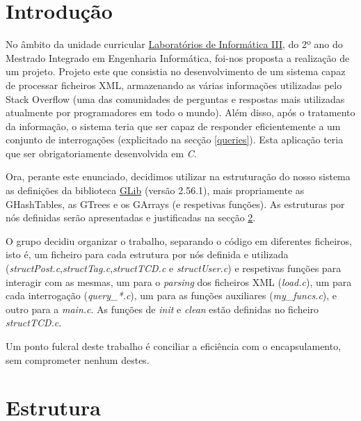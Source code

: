 \documentclass[a4paper, 11pt, oneside]{article}
\begin{document}

\tableofcontents
\lstlistoflistings

\newpage


\section{Introdução}

No âmbito da unidade curricular \underline{Laboratórios de Informática III}, do 2º ano do Mestrado Integrado em Engenharia Informática, foi-nos proposta a realização de um projeto. Projeto este que consistia no desenvolvimento de um sistema capaz de processar ficheiros XML, armazenando as várias informações utilizadas pelo Stack Overflow (uma das comunidades de perguntas e respostas mais utilizadas atualmente por programadores em todo o mundo). Além disso, após o tratamento da informação, o sistema teria que ser capaz de responder eficientemente a um conjunto de interrogações (explicitado na secção \ref{queries}). Esta aplicação teria que ser obrigatoriamente desenvolvida em \textit{C}.

Ora, perante este enunciado, decidimos utilizar na estruturação do nosso sistema as definições da biblioteca \href{https://developer.gnome.org/glib}{GLib} (versão 2.56.1), mais propriamente as GHashTables, as GTrees e os GArrays (e respetivas funções). As estruturas por nós definidas serão apresentadas e justificadas na secção \ref{structs}.

O grupo decidiu organizar o trabalho, separando o código em diferentes ficheiros, isto é, um ficheiro para cada estrutura por nós definida e utilizada (\textit{structPost.c},\textit{structTag.c},\textit{structTCD.c} e \textit{structUser.c}) e respetivas funções para interagir com as mesmas, um para o \textit{parsing} dos ficheiros XML (\textit{load.c}), um para cada interrogação (\textit{query\_*.c}), um para as funções auxiliares (\textit{my\_funcs.c}), e outro para a \textit{main.c}. As funções de \textit{init} e \textit{clean} estão definidas no ficheiro \textit{structTCD.c}.

Um ponto fulcral deste trabalho é conciliar a eficiência com o encapsulamento, sem comprometer nenhum destes.


\newpage
\section{Estrutura}
\label{structs}
\end{document}
